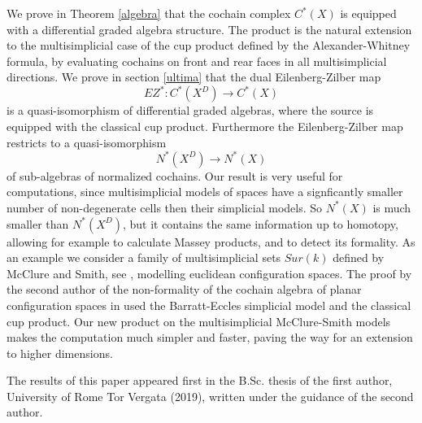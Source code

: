 \documentclass[a4paper,11pt]{article}
\theoremstyle{remark}
\theoremstyle{definition}
\begin{document}
 We prove in Theorem \ref{algebra}  %
 that the cochain complex $C^*(X)$ is equipped with a differential graded algebra structure.
 The product is the natural extension to the multisimplicial case of the cup product  defined by the Alexander-Whitney formula, by
  evaluating cochains on front and rear faces in all multisimplicial directions. %
  We prove in section \ref{ultima}
   that the dual Eilenberg-Zilber map
 $$EZ^*:C^*(X^D) \to C^*(X)$$ %
  is a quasi-isomorphism of differential graded algebras, where the source is equipped with the classical cup product.  
 Furthermore the Eilenberg-Zilber map restricts to a quasi-isomorphism $$N^*(X^D) \to N^*(X)$$ of sub-algebras of normalized cochains.   
 Our result is very useful for computations, since multisimplicial models of spaces have a signficantly smaller number of non-degenerate cells then their simplicial models.
So $N^*(X)$ is much smaller than $N^*(X^D)$, but it contains the same information up to homotopy, 
allowing for example 
to calculate Massey products, and to detect its formality. 
As an example we consider a family of multisimplicial sets $Sur(k)$ defined  by McClure and Smith, see \cite{MS},  modelling euclidean configuration spaces.
The proof by the second author of the non-formality of the cochain algebra of planar configuration spaces in \cite{formality}  used the Barratt-Eccles simplicial model and the classical cup product.
Our new product on the multisimplicial McClure-Smith models makes the computation much simpler and faster, paving the way for an extension to higher dimensions. 

\medskip



The results of this paper appeared first in the B.Sc. thesis of the first author, University of Rome Tor Vergata (2019), written under the guidance of the second author.
\end{document}

